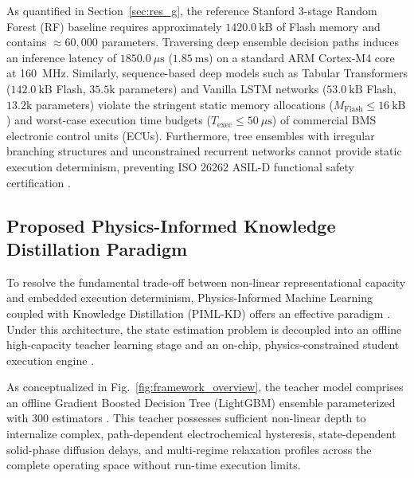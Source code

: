 As quantified in Section~\ref{sec:res_g}, the reference Stanford 3-stage Random Forest (RF) baseline \cite{che2025enhanced} requires approximately $1420.0\ \text{kB}$ of Flash memory and contains $\approx 60,000$ parameters. Traversing deep ensemble decision paths induces an inference latency of $1850.0\ \mu\text{s}$ ($1.85\ \text{ms}$) on a standard ARM Cortex-M4 core at 160~MHz. Similarly, sequence-based deep models such as Tabular Transformers ($142.0\ \text{kB}$ Flash, $35.5\text{k}$ parameters) \cite{chen2024transformer} and Vanilla LSTM networks ($53.0\ \text{kB}$ Flash, $13.2\text{k}$ parameters) \cite{xiong2018towards} violate the stringent static memory allocations ($M_{\text{Flash}} \le 16\ \text{kB}$) and worst-case execution time budgets ($T_{\text{exec}} \le 50\ \mu\text{s}$) of commercial BMS electronic control units (ECUs). Furthermore, tree ensembles with irregular branching structures and unconstrained recurrent networks cannot provide static execution determinism, preventing ISO 26262 ASIL-D functional safety certification \cite{yahyaei2023embedded}.

\subsection{Proposed Physics-Informed Knowledge Distillation Paradigm}
\label{sec:intro_c}

To resolve the fundamental trade-off between non-linear representational capacity and embedded execution determinism, Physics-Informed Machine Learning coupled with Knowledge Distillation (PIML-KD) offers an effective paradigm \cite{karniadakis2021physics, li2026condition, amirkhani2021robust, liu2024unsupervised}. Under this architecture, the state estimation problem is decoupled into an offline high-capacity teacher learning stage and an on-chip, physics-constrained student execution engine \cite{amirkhani2021robust, najafi2024statepower, li2026condition}.

As conceptualized in Fig.~\ref{fig:framework_overview}, the teacher model comprises an offline Gradient Boosted Decision Tree (LightGBM) ensemble parameterized with 300 estimators \cite{ke2017lightgbm}. This teacher possesses sufficient non-linear depth to internalize complex, path-dependent electrochemical hysteresis, state-dependent solid-phase diffusion delays, and multi-regime relaxation profiles across the complete operating space without run-time execution limits.

